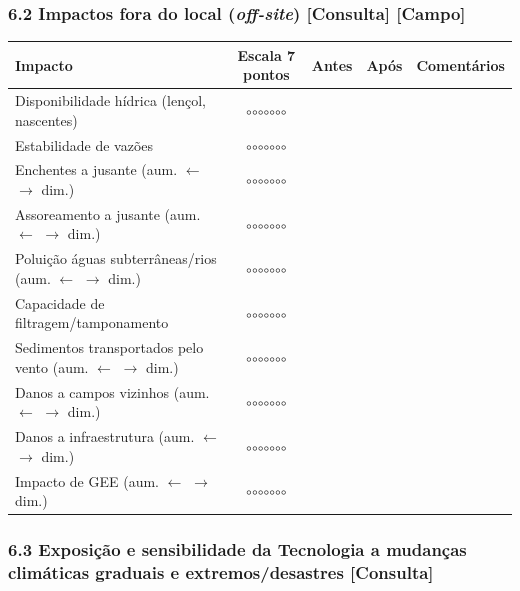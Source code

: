 \subsubsection{\texorpdfstring{6.2 Impactos fora do local (\emph{off-site}) {[Consulta]} {[Campo]}}{6.2 Impactos fora do local (off-site) {[Consulta]} {[Campo]}}}\label{impactos-fora-do-local-off-site}

{
\begin{longtable}[]{@{}lcccl@{}}
\toprule\noalign{}
Impacto & Escala 7 pontos & Antes & Após & Comentários \\
\midrule\noalign{}
\endhead
\bottomrule\noalign{}
\endlastfoot
Disponibilidade hídrica (lençol, nascentes) & $\circ$$\circ$$\circ$$\circ$$\circ$$\circ$$\circ$ & & & \\
Estabilidade de vazões & $\circ$$\circ$$\circ$$\circ$$\circ$$\circ$$\circ$ & & & \\
Enchentes a jusante (aum. $\leftarrow$ $\rightarrow$ dim.) & $\circ$$\circ$$\circ$$\circ$$\circ$$\circ$$\circ$ & & & \\
Assoreamento a jusante (aum. $\leftarrow$ $\rightarrow$ dim.) & $\circ$$\circ$$\circ$$\circ$$\circ$$\circ$$\circ$ & & & \\
Poluição águas subterrâneas/rios (aum. $\leftarrow$ $\rightarrow$ dim.) & $\circ$$\circ$$\circ$$\circ$$\circ$$\circ$$\circ$ & & & \\
Capacidade de filtragem/tamponamento & $\circ$$\circ$$\circ$$\circ$$\circ$$\circ$$\circ$ & & & \\
Sedimentos transportados pelo vento (aum. $\leftarrow$ $\rightarrow$ dim.) & $\circ$$\circ$$\circ$$\circ$$\circ$$\circ$$\circ$ & & & \\
Danos a campos vizinhos (aum. $\leftarrow$ $\rightarrow$ dim.) & $\circ$$\circ$$\circ$$\circ$$\circ$$\circ$$\circ$ & & & \\
Danos a infraestrutura (aum. $\leftarrow$ $\rightarrow$ dim.) & $\circ$$\circ$$\circ$$\circ$$\circ$$\circ$$\circ$ & & & \\
Impacto de GEE (aum. $\leftarrow$ $\rightarrow$ dim.) & $\circ$$\circ$$\circ$$\circ$$\circ$$\circ$$\circ$ & & & \\
\end{longtable}
}

\subsubsection{6.3 Exposição e sensibilidade da Tecnologia a mudanças climáticas graduais e extremos/desastres {[Consulta]}}\label{exposiuxe7uxe3o-e-sensibilidade-da-tecnologia-a-mudanuxe7as-climuxe1ticas-graduais-e-extremosdesastres}

